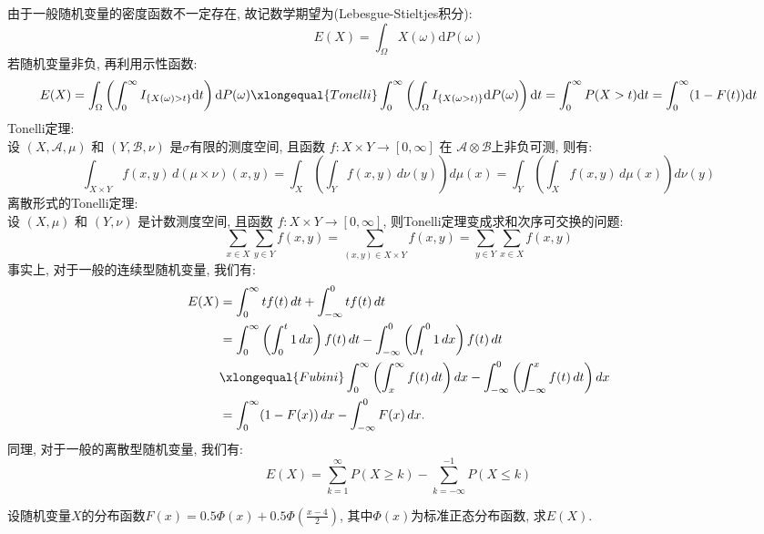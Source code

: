 \documentclass[standard]{ExBook}
\begin{document}
\begin{qitems}
\begin{bbox}
由于一般随机变量的密度函数不一定存在, 故记数学期望为(Lebesgue-Stieltjes积分):
$$E(X)=\int_{\Omega}X(\omega)\mathrm{d}P(\omega)$$
若随机变量非负, 再利用示性函数:
$$E(X)=\int_{\Omega}\left(\int_{0}^{\infty}I_{\{X(\omega)>t\}}\mathrm{d}t\right)\mathrm{d}P(\omega) \xlongequal{Tonelli}\int_{0}^{\infty}\left(\int_{\Omega}I_{\{X(\omega>t)\}}\mathrm{d}P(\omega)\right)\mathrm{d}t=\int_{0}^{\infty}P(X>t)\mathrm{d}t=\int_{0}^{\infty}(1-F(t))\mathrm{d}t$$
\textcolor{themeColor}{\selectfont {}
Tonelli定理:\\
设 $(X, \mathcal{A}, \mu)$ 和 $(Y, \mathcal{B}, \nu)$ 是$\sigma$有限的测度空间, 且函数 $f: X \times Y \to [0, \infty]$ 在 $\mathcal{A} \otimes \mathcal{B}$上非负可测, 则有:
\[
\int_{X \times Y} f(x,y)\, d(\mu \times \nu)(x,y)
= \int_X \left( \int_Y f(x,y)\, d\nu(y) \right) d\mu(x)
= \int_Y \left( \int_X f(x,y)\, d\mu(x) \right) d\nu(y)
\]
离散形式的Tonelli定理:\\
设 $(X, \mu)$ 和 $(Y, \nu)$ 是计数测度空间, 且函数 $f: X \times Y \to [0, \infty]$, 则Tonelli定理变成求和次序可交换的问题:
\[
\sum_{x \in X} \sum_{y \in Y} f(x, y)
= \sum_{(x, y) \in X \times Y} f(x, y)
= \sum_{y \in Y} \sum_{x \in X} f(x, y)
\]
}
\textcolor{themeColor}{\selectfont {}事实上, 对于一般的连续型随机变量, 我们有:
\begin{align*}
E(X) 
&= \int_{0}^{\infty} t f(t) \, dt + \int_{-\infty}^{0} t f(t) \, dt \\
&= \int_{0}^{\infty} \left( \int_{0}^{t} 1 \, dx \right) f(t) \, dt - \int_{-\infty}^{0} \left( \int_{t}^{0} 1 \, dx \right) f(t) \, dt \\
&\xlongequal{Fubini} \int_{0}^{\infty} \left( \int_{x}^{\infty} f(t) \, dt \right) dx - \int_{-\infty}^{0} \left( \int_{-\infty}^{x} f(t) \, dt \right) dx \\
&= \int_{0}^{\infty} (1 - F(x)) \, dx - \int_{-\infty}^{0} F(x) \, dx.
\end{align*}
同理, 对于一般的离散型随机变量, 我们有:
\[
E(X) = \sum_{k=1}^{\infty} P(X \geq k) - \sum_{k=-\infty}^{-1} P(X \leq k)
\]
}
    \end{bbox}

\vspace{-5em}

    \begin{bbox}
    \begin{shaded}
        \qitem
设随机变量$ X $的分布函数$F(x)=0.5\Phi(x)+0.5\Phi\left(\displaystyle\frac{x-4}{2}\right)$, 其中$\Phi(x)$为标准正态分布函数, 求$E(X)$.
    \end{shaded}
    \end{bbox}


\end{qitems}
\end{document}
